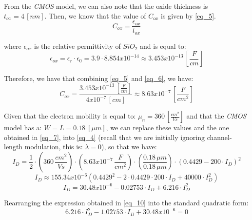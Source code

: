 \documentclass[12pt,a4paper]{article}
\begin{document}
From the \textit{CMOS} model, we can also note that the oxide thickness is $t_{ox} = 4 \, [nm]$. Then, we know that the value of $C_{ox}$ is given by \autoref{eq_5}.
\begin{equation}
    C_{ox} = \frac{\epsilon_{ox}}{t_{ox}}
    \label{eq_5}
\end{equation}

\noindent
where $\epsilon_{ox}$ is the relative permittivity of $SiO_{2}$ and is equal to:
\begin{equation}
    \epsilon_{ox} = \epsilon_{r} \cdot \epsilon_{0} = 3.9 \cdot 8.854x10^{-14} \approx 3.453x10^{-13} \, \left[\frac{F}{cm}\right]
    \label{eq_6}
\end{equation}

Therefore, we have that combining \autoref{eq_5} and \autoref{eq_6}, we have:
\begin{equation}
    C_{ox} = \frac{3.453x10^{-13} \, \left[\frac{F}{cm}\right]}{4x10^{-7} \, [cm]} \approx 8.63x10^{-7} \, \left[\frac{F}{cm^{2}} \right]
    \label{eq_7}
\end{equation}

Given that the electron mobility is equal to: $\mu_{n} = 360 \, [\frac{cm^{2}}{Vs}]$ and that the \textit{CMOS} model has a: $W = L = 0.18 \ [\mu m]$, we can replace these values and the one obtained in \autoref{eq_7}, into \autoref{eq_4} (recall that we are initially ignoring channel-length modulation, this is: $\lambda = 0$), so that we have:
\begin{equation}
    I_{D} = \frac{1}{2} \cdot \left(360 \, \frac{cm^{2}}{Vs}\right) \cdot \left(8.63x10^{-7} \, \frac{F}{cm^{2}}\right) \cdot \left(\frac{0.18 \, \mu m}{0.18 \, \mu m}\right) \cdot (0.4429 - 200 \cdot I_{D})^{2}
    \label{eq_8}
\end{equation}
\begin{equation}
    I_{D} \approx 155.34x10^{-6}(0.4429^{2} - 2 \cdot 0.4429 \cdot 200 \cdot I_D + 40000 \cdot I_D^2)
    \label{eq_9}
\end{equation}
\begin{equation}
    I_{D} = 30.48x10^{-6} - 0.02753 \cdot I_{D} + 6.216 \cdot I_{D}^{2}
    \label{eq_10}
\end{equation}

Rearranging the expression obtained in \autoref{eq_10} into the standard quadratic form:
\begin{equation}
    6.216 \cdot I_{D}^{2} - 1.02753 \cdot I_{D} + 30.48x10^{-6} = 0
    \label{eq_11}
\end{equation}
\end{document}
